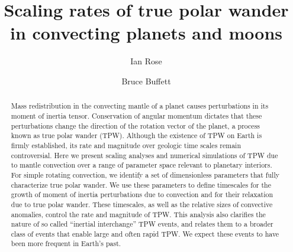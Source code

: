 \documentclass[preprint,12pt,authoryear]{elsarticle}
\begin{document}
\begin{frontmatter}



\title{Scaling rates of true polar wander in convecting planets and moons}


\author{Ian Rose}
\author{Bruce Buffett}


\address{}

\begin{abstract}
Mass redistribution in the convecting mantle of a planet causes perturbations in its moment of inertia tensor. 
Conservation of angular momentum dictates that these perturbations change the direction of the rotation vector of the planet, a process known as true polar wander (TPW). 
Although the existence of TPW on Earth is firmly established, its rate and magnitude over geologic time scales remain controversial. 
Here we present scaling analyses and numerical simulations of TPW due to mantle convection over a range of parameter space relevant to planetary interiors. 
For simple rotating convection, we identify a set of dimensionless parameters that fully characterize true polar wander. We use these parameters to define  timescales for the growth of moment of inertia perturbations due to convection and for their relaxation due to true polar wander. 
These timescales, as well as the relative sizes of convective anomalies, control the rate and magnitude of TPW.
This analysis also clarifies the nature of so called ``inertial interchange'' TPW events, and relates them to a  broader class of events that enable large and often rapid TPW. We expect these events to have been more frequent in Earth’s past.
\end{abstract}


\end{frontmatter}
\end{document}
